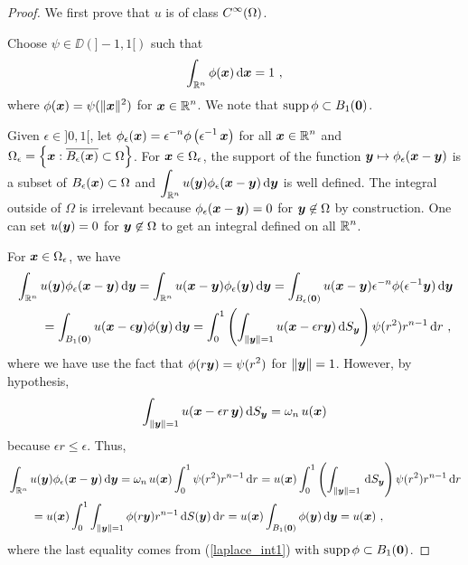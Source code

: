 \begin{proof}
 We first prove that $u$ is of class $\displaystyle C^\infty(\Omega)$.

Choose $\psi \in \DD(]-1,1[)$ such that
\begin{equation} \label{laplace_int1}
\int_{\mathbb{R}^n} \phi({\bm{x}}) \,\mathrm{d}{{\bm{x}}} = 1 \ ,
\end{equation}
where $\displaystyle \phi({\bm{x}}) = \psi(\|{\bm{x}}\|^2)$ for
$\displaystyle {\bm{x}} \in \mathbb{R}^n$.
We note that $\operatorname{supp} \phi \subset B_1({\bm{0}})$.

Given $\epsilon \in ]0,1[$, let
$\displaystyle
\phi_\epsilon({\bm{x}}) = \epsilon^{-n} \phi\left(\epsilon^{-1}\,{\bm{x}}\right)$
for all $\displaystyle {\bm{x}} \in \mathbb{R}^n$ and
$\displaystyle \Omega_\epsilon
= \left\{ {\bm{x}} : \overline{B_\epsilon({\bm{x}})} \subset \Omega \right\}$.
For ${\bm{x}} \in \Omega_\epsilon$, the support of the function
${\bm{y}} \mapsto \phi_\epsilon({\bm{x}}-{\bm{y}})$ is a subset of
$B_\epsilon({\bm{x}}) \subset \Omega$ and
$\displaystyle
\int_{\mathbb{R}^n} u({\bm{y}}) \phi_\epsilon({\bm{x}}-{\bm{y}}) \,\mathrm{d}{{\bm{y}}}$
is well defined.  The integral outside of $\Omega$ is irrelevant
because $\phi_\epsilon({\bm{x}}-{\bm{y}}) = 0$ for
${\bm{y}} \not\in \Omega$ by construction.  One can set $u({\bm{y}})=0$
for ${\bm{y}} \not\in \Omega$ to get an integral defined on all
$\displaystyle \mathbb{R}^n$.

For ${\bm{x}} \in \Omega_\epsilon$, we have
\begin{align*}
&\int_{\mathbb{R}^n} u({\bm{y}}) \phi_\epsilon({\bm{x}}-{\bm{y}}) \,\mathrm{d}{{\bm{y}}} =
\int_{\mathbb{R}^n} u({\bm{x}}-{\bm{y}}) \phi_\epsilon({\bm{y}}) \,\mathrm{d}{{\bm{y}}}
=\int_{B_\epsilon({\bm{0}})} u({\bm{x}}-{\bm{y}})
\epsilon^{-n} \phi(\epsilon^{-1} {\bm{y}}) \,\mathrm{d}{{\bm{y}}} \\
&\qquad =\int_{B_1({\bm{0}})} u({\bm{x}}-\epsilon {\bm{y}})
\phi({\bm{y}}) \,\mathrm{d}{{\bm{y}}}
=\int_0^1 \left(
\int_{\|{\bm{y}}\|=1} u({\bm{x}}-\epsilon r {\bm{y}}) \,\mathrm{d}{S}_{{\bm{y}}} \right)
\psi(r^2) r^{n-1} \,\mathrm{d}{r} \ ,
\end{align*}
where we have use the fact that $\displaystyle \phi(r{\bm{y}}) = \psi(r^2)$ for
$\|{\bm{y}}\| = 1$.  However, by hypothesis,
\[
\int_{\|{\bm{y}}\|=1} u({\bm{x}}-\epsilon r\, {\bm{y}}) \,\mathrm{d}{S}_{{\bm{y}}}
= \omega_n \, u({\bm{x}})
\]
because $\epsilon r \leq \epsilon$.  Thus,
\begin{align*}
&\int_{\mathbb{R}^n} u({\bm{y}}) \phi_\epsilon({\bm{x}}-{\bm{y}}) \,\mathrm{d}{{\bm{y}}}
= \omega_n \, u({\bm{x}}) \int_0^1 \psi(r^2) r^{n-1} \,\mathrm{d}{r}
= u({\bm{x}}) \int_0^1 \left( \int_{\|{\bm{y}}\|=1} \,\mathrm{d}{S}_{{\bm{y}}}\right)
\psi(r^2) r^{n-1} \,\mathrm{d}{r} \\
&\qquad = u({\bm{x}}) \int_0^1 \int_{\|{\bm{y}}\|=1} \phi(r{\bm{y}}) r^{n-1}
\,\mathrm{d}{S({\bm{y}})} \,\mathrm{d}{r}
= u({\bm{x}}) \int_{B_1({\bm{0}})} \phi({\bm{y}}) \,\mathrm{d}{{\bm{y}}} = u({\bm{x}}) \ ,
\end{align*}
where the last equality comes from (\ref{laplace_int1}) with
$\operatorname{supp} \phi \subset B_1({\bm{0}})$.


\end{proof}
